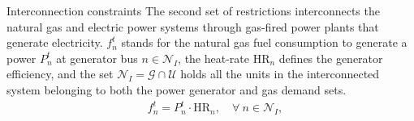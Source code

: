 \documentclass[hyperref={colorlinks,citecolor=blue,linkcolor=blue,urlcolor=blue}]{beamer}
\begin{document}
\begin{frame}{Interconnection constraints}
The second set of restrictions interconnects the natural gas and electric power systems through gas-fired power plants that generate electricity.  $f_{n}^t$ stands for the natural gas fuel consumption to generate a power $P_{n}^t$ at generator bus $n\in\mathcal{N}_I$, the heat-rate $\text{HR}_n$ defines the generator efficiency, and the set $\mathcal{N}_I=\mathcal{G}\cap\mathcal{U}$ holds all the units in the interconnected system belonging to both the power generator and gas demand sets.
    \begin{align}
    &f_{n}^t = P_{n}^t \cdot \text{HR}_n, \quad \forall \ n \in \mathcal{N}_I, \label{eq:gas_power_relation} 
\end{align}
\end{frame}
\end{document}
